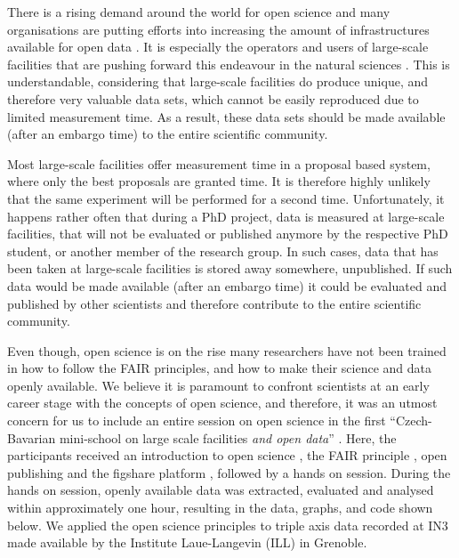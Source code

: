 \documentclass[aps,pra,reprint,amsmath,amssymb,superscriptaddress,showkeys]{revtex4-1}
\begin{document}
There is a rising demand around the world for open science and many organisations are putting efforts into increasing the amount of infrastructures available for open data \cite{plos, sharing, panosc, nfdi, expands}. 
It is especially the operators and users of large-scale facilities that are pushing forward this endeavour in the natural sciences \cite{panosc, nfdi, expands}.
This is understandable, considering that large-scale facilities do produce unique, and therefore very valuable data sets, which cannot be easily reproduced due to limited measurement time. As a result, these data sets should be made available (after an embargo time) to the entire scientific community. 

Most large-scale facilities offer measurement time in a proposal based system, where only the best proposals are granted time.
It is therefore highly unlikely that the same experiment will be performed for a second time. 
Unfortunately, it happens rather often that during a PhD project, data is measured at large-scale facilities, that will not be evaluated or published anymore by the respective PhD student, or another member of the research group.
In such cases, data that has been taken at large-scale facilities is stored away somewhere, unpublished.
If such data would be made available (after an embargo time) it could be evaluated and published by other scientists and therefore contribute to the entire scientific community.

Even though, open science is on the rise many researchers have not been trained in how to follow the FAIR principles, and how to make their science and data openly available.
We believe it is paramount to confront scientists at an early career stage with the concepts of open science, and therefore, it was an utmost concern for us to include an entire session on open science in the first ``Czech-Bavarian mini-school on large scale facilities \emph{and open data}'' \cite{mini-school}.
Here, the participants received an introduction to open science \cite{foster}, the FAIR principle \cite{FAIR}, open publishing \cite{arXiv} and the figshare platform \cite{figshare}, followed by a hands on session.
During the hands on session, openly available data was extracted, evaluated and analysed within approximately one hour, resulting in the data, graphs, and code \cite{data-evaluation, data-docker} shown below.
We applied the open science principles to triple axis data recorded at IN3 \cite{data} made available by the Institute Laue-Langevin (ILL) in Grenoble.
\end{document}
